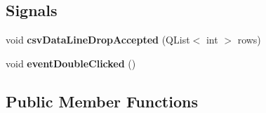 \subsection*{Signals}
\begin{DoxyCompactItemize}
\item 
\hypertarget{class_events_scene_a8f8ea752cc5ff6a77c42911820c8dee7}{void {\bfseries csv\-Data\-Line\-Drop\-Accepted} (Q\-List$<$ int $>$ rows)}\label{class_events_scene_a8f8ea752cc5ff6a77c42911820c8dee7}

\item 
\hypertarget{class_events_scene_aee84d55661899ff8053b2120baccbf71}{void {\bfseries event\-Double\-Clicked} ()}\label{class_events_scene_aee84d55661899ff8053b2120baccbf71}

\end{DoxyCompactItemize}
\subsection*{Public Member Functions}
